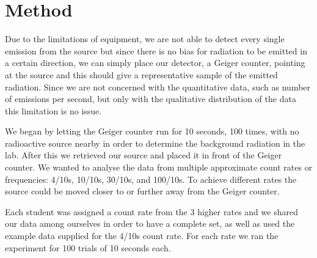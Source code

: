 \documentclass[12pt]{article}
\numberwithin{equation}{section}
\numberwithin{figure}{section}
\numberwithin{table}{section}
\begin{document}
\section{Method}\label{sec:Method}
\par Due to the limitations of equipment, we are not able to detect every single emission from the source but since there is no bias for radiation to be emitted in a certain direction, we can simply place our detector, a Geiger counter, pointing at the source and this should give a representative sample of the emitted radiation. Since we are not concerned with the quantitative data, such as number of emissions per second, but only with the qualitative distribution of the data this limitation is no issue. 
\par We began by letting the Geiger counter run for 10 seconds, 100 times, with no radioactive source nearby in order to determine the background radiation in the lab. After this we retrieved our  source and placed it in front of the Geiger counter. We wanted to analyse the data from multiple approximate count rates or frequencies: 4/10s, 10/10s, 30/10s, and 100/10s. To achieve different rates the source could be moved closer to or further away from the Geiger counter.
\par Each student was assigned a count rate from the 3 higher rates and we shared our data among ourselves in order to have a complete set, as well as used the example data supplied for the 4/10s count rate. For each rate we ran the experiment for 100 trials of 10 seconds each.
\end{document}
